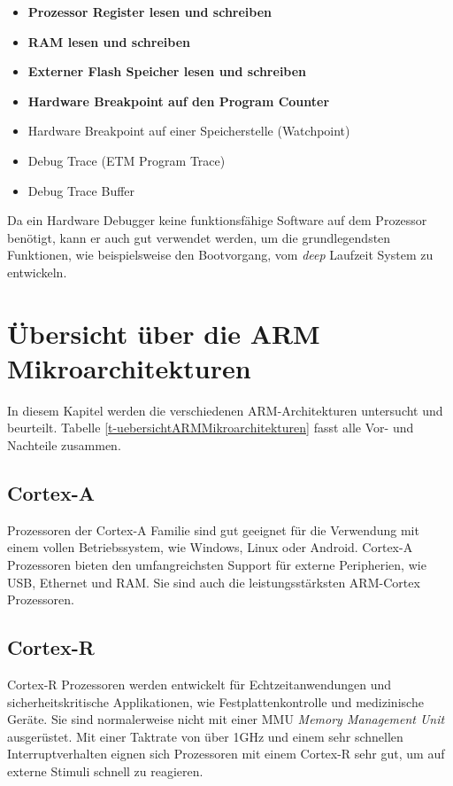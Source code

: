 \begin{itemize}
	\item \textbf{Prozessor Register lesen und schreiben}
	\item \textbf{RAM lesen und schreiben}
	\item \textbf{Externer Flash Speicher lesen und schreiben} 
	\item \textbf{Hardware Breakpoint auf den Program Counter} 
	\item Hardware Breakpoint auf einer Speicherstelle (Watchpoint)
	\item Debug Trace (ETM Program Trace) 
	\item Debug Trace Buffer
\end{itemize}

Da ein Hardware Debugger keine funktionsfähige Software auf dem Prozessor benötigt, kann er auch gut verwendet werden, um die grundlegendsten Funktionen, wie beispielsweise den Bootvorgang, vom \textit{deep} Laufzeit System zu entwickeln.




\section{Übersicht über die ARM Mikroarchitekturen}
In diesem Kapitel werden die verschiedenen ARM-Architekturen untersucht und beurteilt.
Tabelle \ref{t-uebersichtARMMikroarchitekturen} fasst alle Vor- und Nachteile zusammen.

\subsection{Cortex-A}
Prozessoren der Cortex-A Familie sind gut geeignet für die Verwendung mit einem vollen Betriebssystem, wie Windows, Linux oder Android.
Cortex-A Prozessoren bieten den umfangreichsten Support für externe Peripherien, wie USB, Ethernet und RAM.
Sie sind auch die leistungsstärksten ARM-Cortex Prozessoren.

\subsection{Cortex-R}
Cortex-R Prozessoren werden entwickelt für Echtzeitanwendungen und sicherheitskritische Applikationen, wie Festplattenkontrolle und medizinische Geräte.
Sie sind normalerweise nicht mit einer MMU \textit{Memory Management Unit} ausgerüstet.
Mit einer Taktrate von über 1GHz und einem sehr schnellen Interruptverhalten eignen sich Prozessoren mit einem Cortex-R sehr gut, um auf externe Stimuli schnell zu reagieren.

